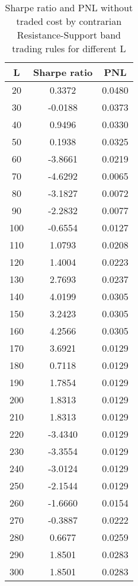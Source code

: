 \documentclass[11pt]{article}
\begin{document}
\begin{table}[ht]
\centering
\begin{tabular}{ccc}
  \hline
L & Sharpe ratio & PNL \\ 
  \hline
   20 & 0.3372 & 0.0480 \\ 
     30 & -0.0188 & 0.0373 \\ 
     40 & 0.9496 & 0.0330 \\ 
     50 & 0.1938 & 0.0325 \\ 
     60 & -3.8661 & 0.0219 \\ 
     70 & -4.6292 & 0.0065 \\ 
     80 & -3.1827 & 0.0072 \\ 
     90 & -2.2832 & 0.0077 \\ 
    100 & -0.6554 & 0.0127 \\ 
    110 & 1.0793 & 0.0208 \\ 
    120 & 1.4004 & 0.0223 \\ 
    130 & 2.7693 & 0.0237 \\ 
    140 & 4.0199 & 0.0305 \\ 
    150 & 3.2423 & 0.0305 \\ 
    160 & 4.2566 & 0.0305 \\ 
    170 & 3.6921 & 0.0129 \\ 
    180 & 0.7118 & 0.0129 \\ 
    190 & 1.7854 & 0.0129 \\ 
    200 & 1.8313 & 0.0129 \\ 
    210 & 1.8313 & 0.0129 \\ 
    220 & -3.4340 & 0.0129 \\ 
    230 & -3.3554 & 0.0129 \\ 
    240 & -3.0124 & 0.0129 \\ 
    250 & -2.1544 & 0.0129 \\ 
    260 & -1.6660 & 0.0154 \\ 
    270 & -0.3887 & 0.0222 \\ 
    280 & 0.6677 & 0.0259 \\ 
    290 & 1.8501 & 0.0283 \\ 
    300 & 1.8501 & 0.0283 \\ 
   \hline
\end{tabular}
\caption{Sharpe ratio and PNL without traded cost by contrarian Resistance-Support band trading rules for different L}\label{RS_notc_con}
\end{table}
\end{document}
